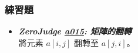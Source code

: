 \subsubsection*{練習題}
\begin{itemize}[label={\Checkmark}]
\item \textbf{\textit{ZeroJudge \href{http://zerojudge.tw/ShowProblem?problemid=a015}{a015}: 矩陣的翻轉}}\\
將元素 $a[i,j]$ 翻轉至 $a[j,i]$。
\end{itemize}